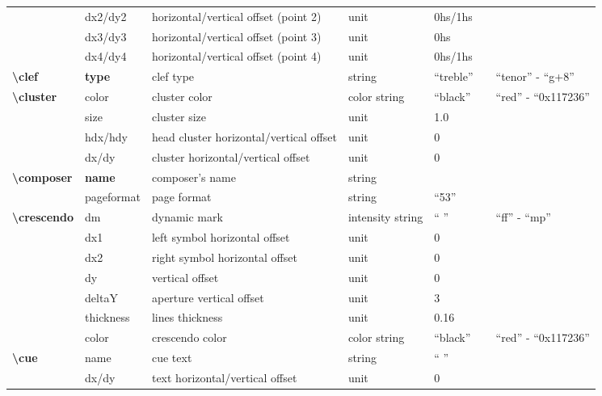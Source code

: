 \documentclass[a4paper, landscape, 10pt]{article}
\begin{document}
\begin{tabularx}{\linewidth}{p{3cm}p{2cm}p{5.5cm}p{2.5cm}p{3.5cm}p{4cm}p{3.5cm}}
    &dx2/dy2&horizontal/vertical offset (point 2)&unit&0hs/1hs&&\\
    &dx3/dy3&horizontal/vertical offset (point 3)&unit&0hs&&\\
    &dx4/dy4&horizontal/vertical offset (point 4)&unit&0hs/1hs&&\\
    \hline
    \textbf{\textbackslash{}clef}&\textbf{type}&clef type&string&``treble''&&``tenor'' - ``g+8''\\
    \hline
    \textbf{\textbackslash{}cluster}&color&cluster color&color string&``black''&&``red'' - ``0x117236''\\
    &size&cluster size&unit&1.0&&\\
    &hdx/hdy&head cluster horizontal/vertical offset&unit&0&&\\
    &dx/dy&cluster horizontal/vertical offset&unit&0&&\\
    \hline
    \textbf{\textbackslash{}composer}&\textbf{name}&composer's name&string&&&\\
    &pageformat&page format&string&``53''&&\\ %
    \hline
    \textbf{\textbackslash{}crescendo}&dm&dynamic mark&intensity string&`` ''&&``ff'' - ``mp''\\
    &dx1&left symbol horizontal offset&unit&0&&\\
    &dx2&right symbol horizontal offset&unit&0&&\\
    &dy&vertical offset&unit&0&&\\
    &deltaY&aperture vertical offset&unit&3&&\\
    &thickness&lines thickness&unit&0.16&&\\
    &color&crescendo color&color string&``black''&&``red'' - ``0x117236''\\
    \hline
    \textbf{\textbackslash{}cue}&name&cue text&string&`` ''&&\\
    &dx/dy&text horizontal/vertical offset&unit&0&&\\
    \hline
\end{tabularx}
\end{document}
